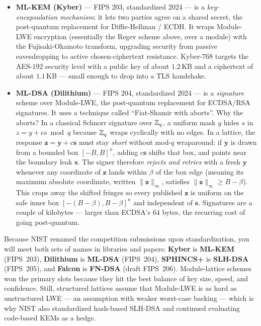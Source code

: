 \begin{itemize}
  \item \textbf{ML-KEM (Kyber)} --- FIPS 203, standardized 2024 --- is a \emph{key-encapsulation mechanism}: it lets two parties agree on a shared secret, the post-quantum replacement for Diffie-Hellman / ECDH. It wraps Module-LWE encryption (essentially the Regev scheme above, over a module) with the Fujisaki-Okamoto transform, upgrading security from passive eavesdropping to active chosen-ciphertext resistance. Kyber-768 targets the AES-192 security level with a public key of about $1.2$\,KB and a ciphertext of about $1.1$\,KB --- small enough to drop into a TLS handshake.
  \item \textbf{ML-DSA (Dilithium)} --- FIPS 204, standardized 2024 --- is a \emph{signature} scheme over Module-LWE, the post-quantum replacement for ECDSA/RSA signatures. It uses a technique called ``Fiat-Shamir with aborts''. Why the aborts? In a classical Schnorr signature over $\mathbb{Z}_q$, a uniform mask $y$ hides $s$ in $z = y + cs \bmod q$ because $\mathbb{Z}_q$ wraps cyclically with no edges. In a lattice, the response $\mathbf{z} = \mathbf{y} + c\mathbf{s}$ must stay \emph{short} without mod-$q$ wraparound: if $\mathbf{y}$ is drawn from a bounded box $[-B, B]^n$, adding $c\mathbf{s}$ shifts that box, and points near the boundary leak $\mathbf{s}$. The signer therefore \emph{rejects and retries} with a fresh $\mathbf{y}$ whenever any coordinate of $\mathbf{z}$ lands within $\beta$ of the box edge (meaning its maximum absolute coordinate, written $\|\mathbf{z}\|_\infty$, satisfies $\|\mathbf{z}\|_\infty \ge B - \beta$). This crops away the shifted fringes so every published $\mathbf{z}$ is uniform on the safe inner box $[-(B-\beta), B-\beta]^n$ and independent of $\mathbf{s}$. Signatures are a couple of kilobytes --- larger than ECDSA's $64$ bytes, the recurring cost of going post-quantum.
\end{itemize}

\begin{focusbox}
Because NIST renamed the competition submissions upon standardization, you will meet both sets of names in libraries and papers: \textbf{Kyber} is \textbf{ML-KEM} (FIPS~203), \textbf{Dilithium} is \textbf{ML-DSA} (FIPS~204), \textbf{SPHINCS+} is \textbf{SLH-DSA} (FIPS~205), and \textbf{Falcon} is \textbf{FN-DSA} (draft FIPS~206). Module-lattice schemes won the primary slots because they hit the best balance of key size, speed, and confidence. Still, structured lattices assume that Module-LWE is as hard as unstructured LWE --- an assumption with weaker worst-case backing --- which is why NIST also standardized hash-based SLH-DSA and continued evaluating code-based KEMs as a hedge.
\end{focusbox}

